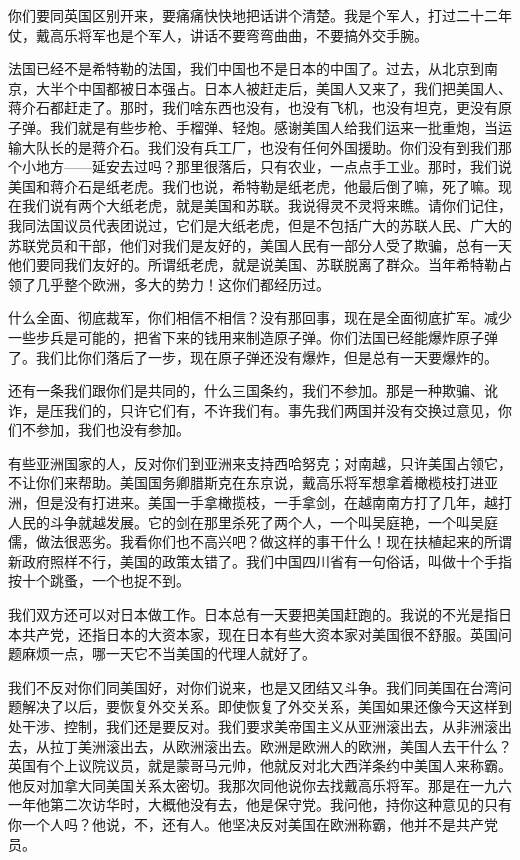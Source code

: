 你们要同英国区别开来，要痛痛快快地把话讲个清楚。我是个军人，打过二十二年仗，戴高乐将军也是个军人，讲话不要弯弯曲曲，不要搞外交手腕。

法国已经不是希特勒的法国，我们中国也不是日本的中国了。过去，从北京到南京，大半个中国都被日本强占。日本人被赶走后，美国人又来了，我们把美国人、蒋介石都赶走了。那时，我们啥东西也没有，也没有飞机，也没有坦克，更没有原子弹。我们就是有些步枪、手榴弹、轻炮。感谢美国人给我们运来一批重炮，当运输大队长的是蒋介石。我们没有兵工厂，也没有任何外国援助。你们没有到我们那个小地方——延安去过吗？那里很落后，只有农业，一点点手工业。那时，我们说美国和蒋介石是纸老虎。我们也说，希特勒是纸老虎，他最后倒了嘛，死了嘛。现在我们说有两个大纸老虎，就是美国和苏联。我说得灵不灵将来瞧。请你们记住，我同法国议员代表团说过，它们是大纸老虎，但是不包括广大的苏联人民、广大的苏联党员和干部，他们对我们是友好的，美国人民有一部分人受了欺骗，总有一天他们要同我们友好的。所谓纸老虎，就是说美国、苏联脱离了群众。当年希特勒占领了几乎整个欧洲，多大的势力！这你们都经历过。

什么全面、彻底裁军，你们相信不相信？没有那回事，现在是全面彻底扩军。减少一些步兵是可能的，把省下来的钱用来制造原子弹。你们法国已经能爆炸原子弹了。我们比你们落后了一步，现在原子弹还没有爆炸，但是总有一天要爆炸的。

还有一条我们跟你们是共同的，什么三国条约，我们不参加。那是一种欺骗、讹诈，是压我们的，只许它们有，不许我们有。事先我们两国并没有交换过意见，你们不参加，我们也没有参加。

有些亚洲国家的人，反对你们到亚洲来支持西哈努克；对南越，只许美国占领它，不让你们来帮助。美国国务卿腊斯克在东京说，戴高乐将军想拿着橄榄枝打进亚洲，但是没有打进来。美国一手拿橄揽枝，一手拿剑，在越南南方打了几年，越打人民的斗争就越发展。它的剑在那里杀死了两个人，一个叫吴庭艳，一个叫吴庭儒，做法很恶劣。我看你们也不高兴吧？做这样的事干什么！现在扶植起来的所谓新政府照样不行，美国的政策太错了。我们中国四川省有一句俗话，叫做十个手指按十个跳蚤，一个也捉不到。

我们双方还可以对日本做工作。日本总有一天要把美国赶跑的。我说的不光是指日本共产党，还指日本的大资本家，现在日本有些大资本家对美国很不舒服。英国问题麻烦一点，哪一天它不当美国的代理人就好了。

我们不反对你们同美国好，对你们说来，也是又团结又斗争。我们同美国在台湾问题解决了以后，要恢复外交关系。即使恢复了外交关系，美国如果还像今天这样到处干涉、控制，我们还是要反对。我们要求美帝国主义从亚洲滚出去，从非洲滚出去，从拉丁美洲滚出去，从欧洲滚出去。欧洲是欧洲人的欧洲，美国人去干什么？英国有个上议院议员，就是蒙哥马元帅，他就反对北大西洋条约中美国人来称霸。他反对加拿大同美国关系太密切。我那次同他说你去找戴高乐将军。那是在一九六一年他第二次访华时，大概他没有去，他是保守党。我问他，持你这种意见的只有你一个人吗？他说，不，还有人。他坚决反对美国在欧洲称霸，他并不是共产党员。

